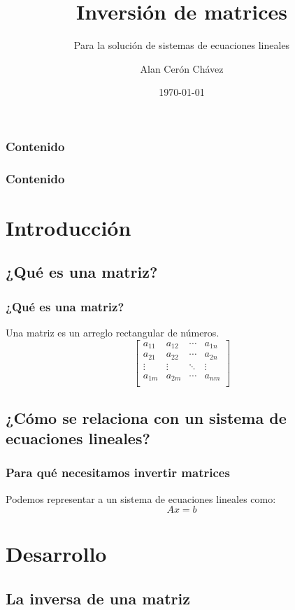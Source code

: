 \documentclass{beamer}
\title{Inversión de matrices}
\subtitle{Para la solución de sistemas de ecuaciones lineales}
\author{Alan Cerón Chávez}
\institute{FES Acatlán - UNAM}
\date{\today}
\begin{document}
    \begin{frame}
        \titlepage
    \end{frame}

    \begin{frame}
        \frametitle{Contenido}
        \tableofcontents[sections=1-2]
    \end{frame}

    \begin{frame}
        \frametitle{Contenido}
        \tableofcontents[sections=3-5]
    \end{frame}

    \section{Introducción}
    \subsection{¿Qué es una matriz?}

    \begin{frame}
        \frametitle{¿Qué es una matriz?}
        Una matriz es un arreglo rectangular de números.
        $$
            \begin{bmatrix}
                a_{11} & a_{12} & \cdots & a_{1n} \\
                a_{21} & a_{22} & \cdots & a_{2n} \\
                \vdots & \vdots & \ddots & \vdots \\
                a_{1m} & a_{2m} & \cdots & a_{nm} \\
            \end{bmatrix}
        $$
    \end{frame}


    \subsection{¿Cómo se relaciona con un sistema de ecuaciones lineales?}
    \begin{frame}
        \frametitle{Para qué necesitamos invertir matrices}
        Podemos representar a un sistema de ecuaciones lineales como:
        $$
        Ax = b
        $$
    \end{frame}
    \section{Desarrollo}
    \subsection{La inversa de una matriz}
\end{document}
